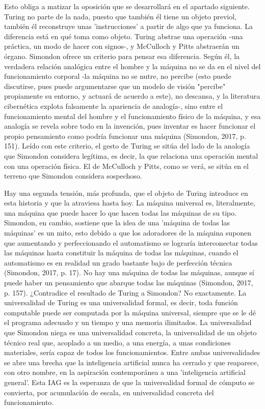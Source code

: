 Esto obliga a matizar la oposición que se desarrollará en el apartado siguiente. Turing no parte de la nada, puesto que también él tiene un objeto previol, también él reconstruye unas 'instrucciones' a partir de algo que ya funciona. La diferencia está en qué toma como objeto. Turing abstrae una operación -una práctica, un modo de hacer con signos-, y McCulloch y Pitts abstraerán un órgano. Simondon ofrece un criterio para pensar esa diferencia. Según él, la verdadera relación analógica entre el hombre y la máquina no se da en el nivel del funcionamiento corporal -la máquina no se nutre, no percibe (esto puede discutirse, pues puede argumentarse que un modelo de visión "percibe" propiamente su entorno, y actuará de acuerdo a este), no descansa, y la literatura cibernética explota falsamente la apariencia de analogía-, sino entre el funcionamiento mental del hombre y el funcionamiento físico de la máquina, y esa analogía se revela sobre todo en la invención, pues inventar es hacer funcionar el propio pensamiento como podría funcionar una máquina (Simondon, 2017, p. 151). Leído con este criterio, el gesto de Turing se sitúa del lado de la analogía que Simondon considera legítima, es decir, la que relaciona una operación mental con una operación física. El de McCulloch y Pitts, como se verá, se sitúa en el terreno que Simondon considera sospechoso.

Hay una segunda tensión, más profunda, que el objeto de Turing introduce en esta historia y que la atraviesa hasta hoy. La máquina universal es, literalmente, una máquina que puede hacer lo que hacen todas las máquinas de su tipo. Simondon, en cambio, sostiene que la idea de una 'máquina de todas las máquinas' es un mito, esto debido a que los adoradores de la máquina suponen que aumentando y perfeccionando el automatismo se lograría interconectar todas las máquinas hasta constituir la máquina de todas las máquinas, cuando el automatismo es en realidad un grado bastante bajo de perfección técnica (Simondon, 2017, p. 17). No hay una máquina de todas las máquinas, aunque sí puede haber un pensamiento que abarque todas las máquinas (Simondon, 2017, p. 157). ¿Contradice el resultado de Turing a Simondon? No exactamente. La universalidad de Turing es una universalidad formal, es decir, toda función computable puede ser computada por la máquina universal, siempre que se le dé el programa adecuado y un tiempo y una memoria ilimitados. La universalidad que Simondon niega es una universalidad concreta, la universalidad de un objeto técnico real que, acoplado a un medio, a una energía, a unas condiciones materiales, sería capaz de todos los funcionamientos. Entre ambas universalidades se abre una brecha que la inteligencia artificial nunca ha cerrado y que reaparece, con otro nombre, en la aspiración contemporánea a una 'inteligencia artificial general'. Esta IAG es la esperanza de que la universalidad formal de cómputo se convierta, por acumulación de escala, en universalidad concreta del funcionamiento.

